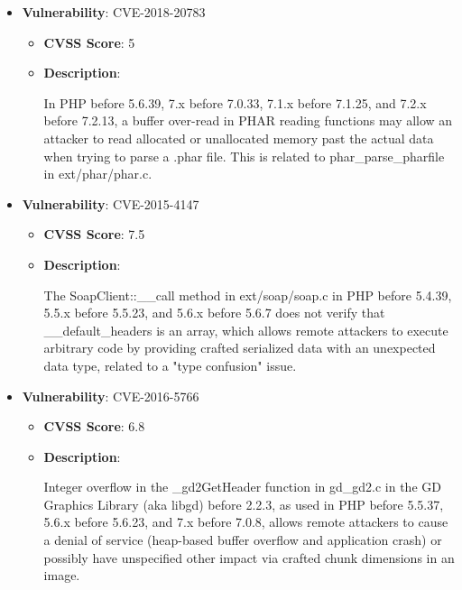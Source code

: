 \documentclass{article}
\begin{document}
\begin{itemize}
        \item \textbf{Vulnerability}: CVE-2018-20783
        \begin{itemize}
            \item \textbf{CVSS Score}:  5 
            \item \textbf{Description}:
            \parbox[t]{0.9\linewidth}{
                \ttfamily In PHP before 5.6.39, 7.x before 7.0.33, 7.1.x before 7.1.25, and 7.2.x before 7.2.13, a buffer over-read in PHAR reading functions may allow an attacker to read allocated or unallocated memory past the actual data when trying to parse a .phar file. This is related to phar\_parse\_pharfile in ext/phar/phar.c.
            }
        \end{itemize}
    
        \item \textbf{Vulnerability}: CVE-2015-4147
        \begin{itemize}
            \item \textbf{CVSS Score}:  7.5 
            \item \textbf{Description}:
            \parbox[t]{0.9\linewidth}{
                \ttfamily The SoapClient::\_\_call method in ext/soap/soap.c in PHP before 5.4.39, 5.5.x before 5.5.23, and 5.6.x before 5.6.7 does not verify that \_\_default\_headers is an array, which allows remote attackers to execute arbitrary code by providing crafted serialized data with an unexpected data type, related to a "type confusion" issue.
            }
        \end{itemize}
    
        \item \textbf{Vulnerability}: CVE-2016-5766
        \begin{itemize}
            \item \textbf{CVSS Score}:  6.8 
            \item \textbf{Description}:
            \parbox[t]{0.9\linewidth}{
                \ttfamily Integer overflow in the \_gd2GetHeader function in gd\_gd2.c in the GD Graphics Library (aka libgd) before 2.2.3, as used in PHP before 5.5.37, 5.6.x before 5.6.23, and 7.x before 7.0.8, allows remote attackers to cause a denial of service (heap-based buffer overflow and application crash) or possibly have unspecified other impact via crafted chunk dimensions in an image.
            }
        \end{itemize}
    

\end{itemize}
\end{document}
